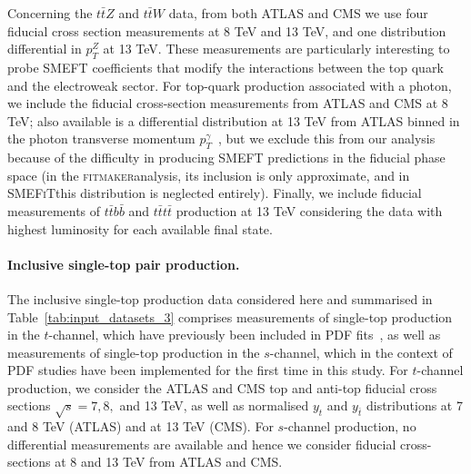 \documentclass[withindex,glossary]{cam-thesis}
\newcommand{\fitm}{\textsc{fitmaker}}
\newcommand{\smefit}{\textsc{SMEFiT}}
\begin{document}
Concerning the $t\bar{t}Z$ and $t\bar{t}W$ data,
from both ATLAS and CMS we use four fiducial cross section measurements at 8 TeV
and 13 TeV,
and one distribution differential in $p_T^Z$ at 13 TeV.
%
These measurements are particularly interesting to probe SMEFT coefficients that
modify the interactions between the top quark and the electroweak sector.
%
For top-quark production associated with a photon, we include the fiducial
cross-section measurements from ATLAS and CMS at 8 TeV; also available is a
differential distribution at 13 TeV from ATLAS binned in the photon transverse
momentum $p_T^\gamma$~\cite{Aad:2020axn}, but we exclude this from our analysis because of the difficulty in
producing SMEFT predictions in the fiducial phase space (in the \fitm analysis, its inclusion
is only approximate, and in \smefit this distribution is neglected entirely).
%
Finally, we include fiducial measurements of
$t\bar{t}b\bar{b}$ and $t\bar{t}t\bar{t}$ production at 13 TeV considering
the data with highest luminosity for each available final state.
%

\paragraph{Inclusive single-top pair production.}
%
The inclusive single-top production data considered here
and summarised in Table~\ref{tab:input_datasets_3}
comprises measurements of
single-top production in the $t$-channel, which have previously been included
in PDF fits~\cite{Nocera:2019wyk,NNPDF:2021njg}, as well as measurements of single-top production in the $s$-channel, which in the context of PDF studies have been implemented for the first time in this study.
%
For $t$-channel production, we consider the ATLAS and CMS top and anti-top fiducial cross sections
$\sqrt{s}=7,8,$ and 13 TeV, as well as normalised $y_t$ and $y_{\bar{t}}$ distributions
at 7 and 8 TeV (ATLAS) and at 13 TeV (CMS).
%
For  $s$-channel production, no differential measurements are available and hence
we consider fiducial cross-sections at 8 and 13 TeV from ATLAS and CMS.


\end{document}
